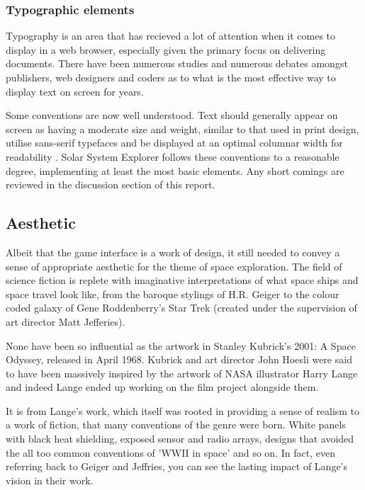 \documentclass[twoside]{bhamthesis}
\begin{document}
\subsubsection{Typographic elements}

Typography is an area that has recieved a lot of attention when it comes to display in a web browser, especially given the primary focus on delivering documents. There have been numerous studies and numerous debates amongst publishers, web designers and coders as to what is the most effective way to display text on screen for years.

Some conventions are now well understood. Text should generally appear on screen as having a moderate size and weight, similar to that used in print design, utilise sans-serif typefaces and be displayed at an optimal columnar width for readability \cite{lupton_type_2014}. Solar System Explorer follows these conventions to a reasonable degree, implementing at least the most basic elements. Any short comings are reviewed in the discussion section of this report.

\subsection{Aesthetic}

Albeit that the game interface is a work of design, it still needed to convey a sense of appropriate aesthetic for the theme of space exploration. The field of science fiction is replete with imaginative interpretations of what space ships and space travel look like, from the baroque stylings of H.R. Geiger to the colour coded galaxy of Gene Roddenberry's Star Trek (created under the supervision of art director Matt Jefferies).

None have been so influential as the artwork in Stanley Kubrick's 2001: A Space Odyssey, released in April 1968. Kubrick and art director John Hoesli were said to have been massively inspired by the artwork of  NASA illustrator Harry Lange \cite{sinclair_harry_2016} and indeed Lange ended up working on the film project alongside them.

It is from Lange's work, which itself was rooted in providing a sense of realism to a work of fiction, that many conventions of the genre were born. White panels with black heat shielding, exposed sensor and radio arrays, designs that avoided the all too common conventions of 'WWII in space' and so on. In fact, even referring back to Geiger and Jeffries, you can see the lasting impact of Lange's vision in their work. 
\end{document}
